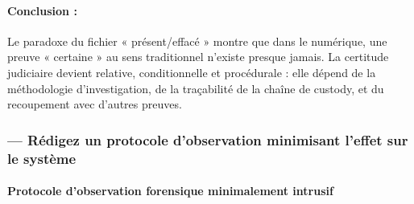 \documentclass[12pt]{article}
\begin{document}
\paragraph{Conclusion :}
Le paradoxe du fichier « présent/effacé » montre que dans le numérique, une preuve « certaine » au sens traditionnel n'existe presque jamais. La certitude judiciaire devient relative, conditionnelle et procédurale : elle dépend de la méthodologie d'investigation, de la traçabilité de la chaîne de custody, et du recoupement avec d'autres preuves.

\subsubsection*{— Rédigez un protocole d'observation minimisant l'effet sur le système}

\paragraph{Protocole d'observation forensique minimalement intrusif}
\end{document}
